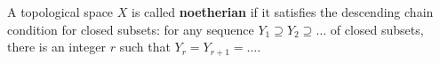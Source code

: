 A topological space $X$ is called \textbf{noetherian} if it satisfies the descending chain condition for closed subsets: for any sequence $Y_1 \supseteq Y_2 \supseteq \ldots$ of closed subsets, there is an integer $r$ such that $Y_r = Y_{r+1} = \ldots$.

